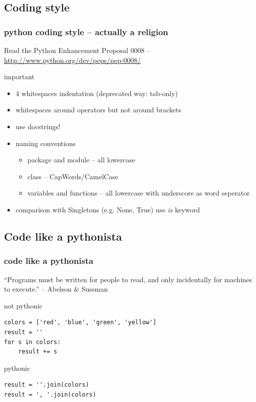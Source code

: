 \documentclass{beamer}
\begin{document}
\subsection{Coding style}
\begin{frame}[fragile]
	\frametitle{python coding style -- actually a religion}
	Read the Python Enhancement Proposal 0008 -- \url{http://www.python.org/dev/peps/pep-0008/}
	\begin{block}{important}
	\begin{itemize}
	\item 4 whitespaces indentation (deprecated way: tab-only)
	\item whitespaces around operators but not around brackets
	\item use docstrings!
	\item naming conventions
		\begin{itemize}
		\item package and module -- all lowercase
		\item class -- CapWords/CamelCase
		\item variables and functions -- all lowercase with underscore as word seperator
		\end{itemize}
	\item comparison with Singletons (e.g. None, True) use \emph{is} keyword
	\end{itemize}
	\end{block}

\end{frame}

\subsection{Code like a pythonista} 
\begin{frame}[fragile]
	\frametitle{code like a pythonista}
    ``Programs must be written for people to read, and only incidentally for machines to execute.'' -- Abelson \& Sussman\\
	\pause    
    
    \begin{alertblock}{not pythonic}
    \begin{lstlisting}
colors = ['red', 'blue', 'green', 'yellow']
result = ''
for s in colors:
    result += s
    \end{lstlisting}
    \end{alertblock}
  	\pause
    \begin{exampleblock}{pythonic}
    \begin{lstlisting}
result = ''.join(colors)
result = ', '.join(colors)
    \end{lstlisting}
    \end{exampleblock}
\end{frame}
\end{document}
